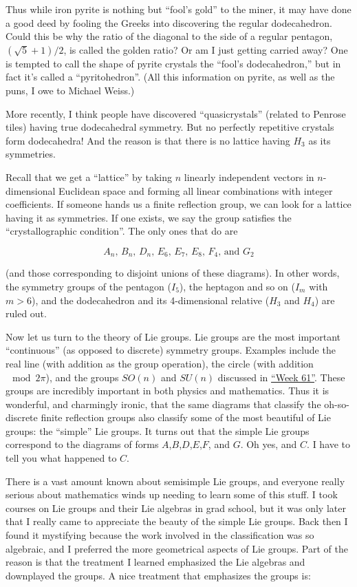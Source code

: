 \documentclass{article}
\begin{document}
Thus while iron pyrite is nothing but ``fool's gold'' to the miner, it
may have done a good deed by fooling the Greeks into discovering the
regular dodecahedron. Could this be why the ratio of the diagonal to the
side of a regular pentagon, \((\sqrt{5} + 1)/2\), is called the golden
ratio? Or am I just getting carried away? One is tempted to call the
shape of pyrite crystals the ``fool's dodecahedron,'' but in fact it's
called a ``pyritohedron''. (All this information on pyrite, as well as
the puns, I owe to Michael Weiss.)

More recently, I think people have discovered ``quasicrystals'' (related
to Penrose tiles) having true dodecahedral symmetry. But no perfectly
repetitive crystals form dodecahedra! And the reason is that there is no
lattice having \(H_3\) as its symmetries.

Recall that we get a ``lattice'' by taking \(n\) linearly independent
vectors in \(n\)-dimensional Euclidean space and forming all linear
combinations with integer coefficients. If someone hands us a finite
reflection group, we can look for a lattice having it as symmetries. If
one exists, we say the group satisfies the ``crystallographic
condition''. The only ones that do are

\[\mbox{$A_n$, $B_n$, $D_n$, $E_6$, $E_7$, $E_8$, $F_4$, and $G_2$}\]

(and those corresponding to disjoint unions of these diagrams). In other
words, the symmetry groups of the pentagon (\(I_5\)), the heptagon and
so on (\(I_m\) with \(m > 6\)), and the dodecahedron and its
4-dimensional relative (\(H_3\) and \(H_4\)) are ruled out.

Now let us turn to the theory of Lie groups. Lie groups are the most
important ``continuous'' (as opposed to discrete) symmetry groups.
Examples include the real line (with addition as the group operation),
the circle (with addition \(\mod 2\pi\)), and the groups \(SO(n)\) and
\(SU(n)\) discussed in \protect\hyperlink{week61}{``Week 61''}. These
groups are incredibly important in both physics and mathematics. Thus it
is wonderful, and charmingly ironic, that the same diagrams that
classify the oh-so-discrete finite reflection groups also classify some
of the most beautiful of Lie groups: the ``simple'' Lie groups. It turns
out that the simple Lie groups correspond to the diagrams of forms
\(A\),\(B\),\(D\),\(E\),\(F\), and \(G\). Oh yes, and \(C\). I have to
tell you what happened to \(C\).

There is a vast amount known about semisimple Lie groups, and everyone
really serious about mathematics winds up needing to learn some of this
stuff. I took courses on Lie groups and their Lie algebras in grad
school, but it was only later that I really came to appreciate the
beauty of the simple Lie groups. Back then I found it mystifying because
the work involved in the classification was so algebraic, and I
preferred the more geometrical aspects of Lie groups. Part of the reason
is that the treatment I learned emphasized the Lie algebras and
downplayed the groups. A nice treatment that emphasizes the groups is:
\end{document}
